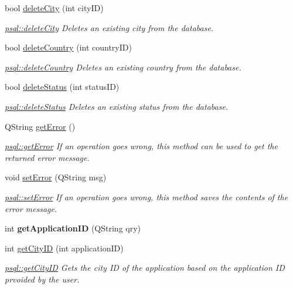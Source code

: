 \begin{DoxyCompactItemize}
bool \hyperlink{classpsql_aaffd42b26b635d9881daaf5fbf4fd62f}{delete\+City} (int city\+ID)
\begin{DoxyCompactList}\small\item\em \hyperlink{classpsql_aaffd42b26b635d9881daaf5fbf4fd62f}{psql\+::delete\+City} Deletes an existing city from the database. \end{DoxyCompactList}\item 
bool \hyperlink{classpsql_a914bf8701fbed4ff80edcd0d09c7c3fd}{delete\+Country} (int country\+ID)
\begin{DoxyCompactList}\small\item\em \hyperlink{classpsql_a914bf8701fbed4ff80edcd0d09c7c3fd}{psql\+::delete\+Country} Deletes an existing country from the database. \end{DoxyCompactList}\item 
bool \hyperlink{classpsql_a26fc592cfb9f484e1bee62af527f2b95}{delete\+Status} (int status\+ID)
\begin{DoxyCompactList}\small\item\em \hyperlink{classpsql_a26fc592cfb9f484e1bee62af527f2b95}{psql\+::delete\+Status} Deletes an existing status from the database. \end{DoxyCompactList}\item 
Q\+String \hyperlink{classpsql_a5f51e254b67ff932f287df2184ccc043}{get\+Error} ()
\begin{DoxyCompactList}\small\item\em \hyperlink{classpsql_a5f51e254b67ff932f287df2184ccc043}{psql\+::get\+Error} If an operation goes wrong, this method can be used to get the returned error message. \end{DoxyCompactList}\item 
void \hyperlink{classpsql_a9a0d5ba32aabe6018a36fb0bc185445b}{set\+Error} (Q\+String msg)
\begin{DoxyCompactList}\small\item\em \hyperlink{classpsql_a9a0d5ba32aabe6018a36fb0bc185445b}{psql\+::set\+Error} If an operation goes wrong, this method saves the contents of the error message. \end{DoxyCompactList}\item 
\mbox{\label{classpsql_a13f28a96fa9f79076ecae7d86280008f}} 
int {\bfseries get\+Application\+ID} (Q\+String qry)
\item 
int \hyperlink{classpsql_af3462a12dc106e0ca8df4fa8fcf28436}{get\+City\+ID} (int application\+ID)
\begin{DoxyCompactList}\small\item\em \hyperlink{classpsql_af3462a12dc106e0ca8df4fa8fcf28436}{psql\+::get\+City\+ID} Gets the city ID of the application based on the application ID prvoided by the user. \end{DoxyCompactList}\item 

\end{DoxyCompactItemize}
